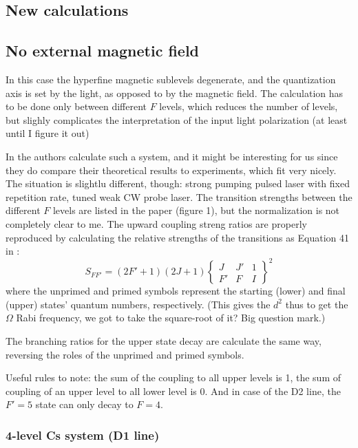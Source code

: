 \documentclass{article}
\begin{document}
\begin{spacing}{1.1}
\section{New calculations}

\subsection{No external magnetic field}

In this case the hyperfine magnetic sublevels degenerate, and the quantization axis is set by the light, as opposed to by the magnetic field. The calculation has to be done only between different $F$ levels, which reduces the number of levels, but slighly complicates the interpretation of the input light polarization (at least until I figure it out)

In \cite{Vujicic2007} the authors calculate such a system, and it might be interesting for us since they do compare their theoretical results to experiments, which fit very nicely. The situation is slightlu different, though: strong pumping pulsed laser with fixed repetition rate, tuned weak CW probe laser. The transition strengths between the different $F$ levels are listed in the paper (figure 1), but the normalization is not completely clear to me. The upward coupling streng ratios are properly reproduced by calculating the relative strengths of the transitions as Equation 41 in \cite{Steck2009}:
\begin{equation}
S_{FF'} = (2 F' + 1)(2 J + 1)\left\{ \begin{matrix}  J & J' & 1 \\  F' & F & I \end{matrix}\right\}^2
\end{equation}
where the unprimed and primed symbols represent the starting (lower) and final (upper) states' quantum numbers, respectively. (This gives the $d^2$ thus to get the $\Omega$ Rabi frequency, we got to take the square-root of it? Big question mark.)

The branching ratios for the upper state decay are calculate the same way, reversing the roles of the unprimed and primed symbols.

Useful rules to note: the sum of the coupling to all upper levels is 1, the sum of coupling of an upper level to all lower level is 0. And in case of the D2 line, the $F'=5$ state can only decay to $F=4$.


\subsubsection{4-level Cs system (D1 line)}


\end{spacing}
\end{document}
